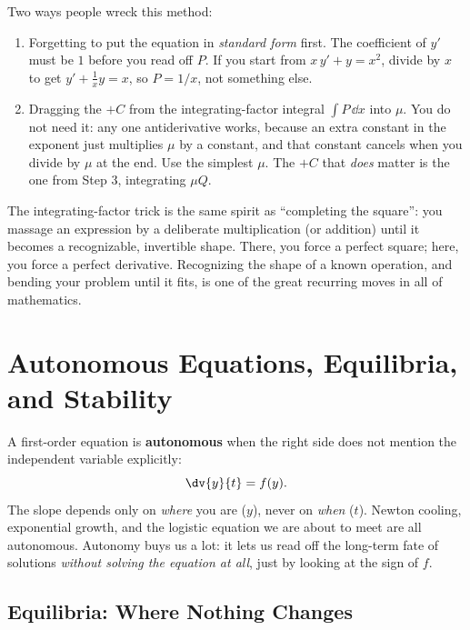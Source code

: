 \begin{trapbox}
Two ways people wreck this method:
\begin{enumerate}
\item Forgetting to put the equation in \emph{standard form} first. The coefficient
of $y'$ must be $1$ before you read off $P$. If you start from
$x\,y' + y = x^2$, divide by $x$ to get $y' + \tfrac1x y = x$, so $P=1/x$, not
something else.
\item Dragging the $+C$ from the integrating-factor integral $\int P\,\dd x$ into
$\mu$. You do not need it: any one antiderivative works, because an extra constant
in the exponent just multiplies $\mu$ by a constant, and that constant cancels when
you divide by $\mu$ at the end. Use the simplest $\mu$. The $+C$ that \emph{does}
matter is the one from Step 3, integrating $\mu Q$.
\end{enumerate}
\end{trapbox}

\begin{connectionbox}
The integrating-factor trick is the same spirit as ``completing the square'': you
massage an expression by a deliberate multiplication (or addition) until it
becomes a recognizable, invertible shape. There, you force a perfect square; here,
you force a perfect derivative. Recognizing the shape of a known operation, and
bending your problem until it fits, is one of the great recurring moves in all of
mathematics.
\end{connectionbox}

\section{Autonomous Equations, Equilibria, and Stability}

A first-order equation is \textbf{autonomous} when the right side does not mention
the independent variable explicitly:
\[
  \dv{y}{t} = f(y).
\]
The slope depends only on \emph{where} you are ($y$), never on \emph{when} ($t$).
Newton cooling, exponential growth, and the logistic equation we are about to meet
are all autonomous. Autonomy buys us a lot: it lets us read off the long-term
fate of solutions \emph{without solving the equation at all}, just by looking at the
sign of $f$.

\subsection{Equilibria: Where Nothing Changes}

